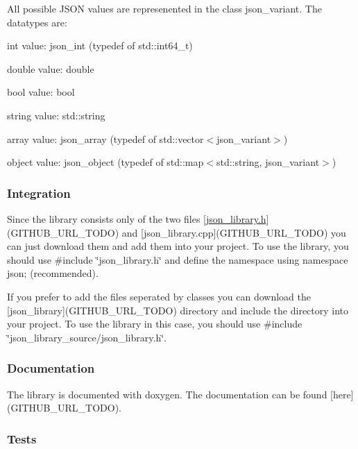 All possible J\+S\+ON values are represenented in the class {\ttfamily json\+\_\+variant}. The datatypes are\+:
\begin{DoxyItemize}
\item int value\+: {\ttfamily json\+\_\+int} (typedef of {\ttfamily std\+::int64\+\_\+t})
\item double value\+: {\ttfamily double}
\item bool value\+: {\ttfamily bool}
\item string value\+: {\ttfamily std\+::string}
\item array value\+: {\ttfamily json\+\_\+array} (typedef of {\ttfamily std\+::vector$<$json\+\_\+variant$>$})
\item object value\+: {\ttfamily json\+\_\+object} (typedef of {\ttfamily std\+::map$<$std\+::string, json\+\_\+variant$>$})
\end{DoxyItemize}

\subsubsection*{\label{_integration_section}%
Integration}

Since the library consists only of the two files \mbox{[}\hyperlink{json__library_8h_source}{json\+\_\+library.\+h}\mbox{]}(G\+I\+T\+H\+U\+B\+\_\+\+U\+R\+L\+\_\+\+T\+O\+DO) and \mbox{[}json\+\_\+library.\+cpp\mbox{]}(G\+I\+T\+H\+U\+B\+\_\+\+U\+R\+L\+\_\+\+T\+O\+DO) you can just download them and add them into your project. To use the library, you should use {\ttfamily \#include \char`\"{}json\+\_\+library.\+h\char`\"{}} and define the namespace {\ttfamily using namespace json;} (recommended).

If you prefer to add the files seperated by classes you can download the \mbox{[}json\+\_\+library\mbox{]}(G\+I\+T\+H\+U\+B\+\_\+\+U\+R\+L\+\_\+\+T\+O\+DO) directory and include the directory into your project. To use the library in this case, you should use {\ttfamily \#include \char`\"{}json\+\_\+library\+\_\+source/json\+\_\+library.\+h\char`\"{}}.

\subsubsection*{\label{_doc_section}%
Documentation}

The library is documented with doxygen. The documentation can be found \mbox{[}here\mbox{]}(G\+I\+T\+H\+U\+B\+\_\+\+U\+R\+L\+\_\+\+T\+O\+DO).

\subsubsection*{\label{_tests_section}%
Tests}

